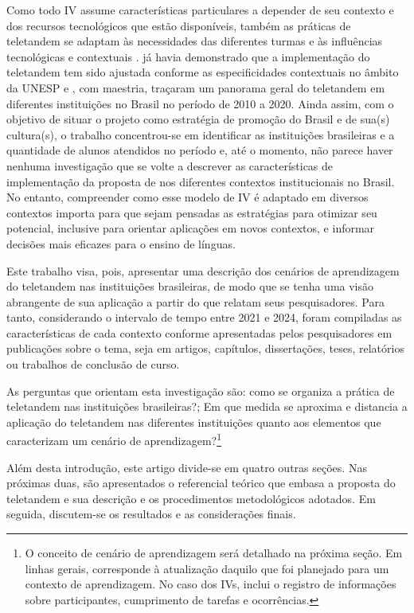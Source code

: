 \documentclass[portuguese]{textolivre}
\begin{document}
Como todo IV assume características particulares a depender de seu contexto e dos recursos tecnológicos que estão disponíveis, também as práticas de teletandem se adaptam às necessidades das diferentes turmas e às influências tecnológicas e contextuais \cite{aranha2021, cavalari2022, ferro2024, sartori2021}. \textcite{cavalari2018} já havia demonstrado que a implementação do teletandem tem sido ajustada conforme as especificidades contextuais no âmbito da UNESP e \textcite{aranha2021}, com maestria, traçaram um panorama geral do teletandem em diferentes instituições no Brasil no período de 2010 a 2020. Ainda assim, com o objetivo de situar o projeto como estratégia de promoção do Brasil e de sua(s) cultura(s), o trabalho concentrou-se em identificar as instituições brasileiras e a quantidade de alunos atendidos no período e, até o momento, não parece haver nenhuma investigação que se volte a descrever as características de implementação da proposta de \textcite{telles2006a} nos diferentes contextos institucionais no Brasil. No entanto, compreender como esse modelo de IV é adaptado em diversos contextos importa para que sejam pensadas as estratégias para otimizar seu potencial, inclusive para orientar aplicações em novos contextos, e informar decisões mais eficazes para o ensino de línguas.

Este trabalho visa, pois, apresentar uma descrição dos cenários de aprendizagem do teletandem nas instituições brasileiras, de modo que se tenha uma visão abrangente de sua aplicação a partir do que relatam seus pesquisadores. Para tanto, considerando o intervalo de tempo entre 2021 e 2024, foram compiladas as características de cada contexto conforme apresentadas pelos pesquisadores em publicações sobre o tema, seja em artigos, capítulos, dissertações, teses, relatórios ou trabalhos de conclusão de curso.

As perguntas que orientam esta investigação são: como se organiza a prática de teletandem nas instituições brasileiras?; Em que medida se aproxima e distancia a aplicação do teletandem nas diferentes instituições quanto aos elementos que caracterizam um cenário de aprendizagem?\footnote{O conceito de cenário de aprendizagem será detalhado na próxima seção. Em linhas gerais, corresponde à atualização daquilo que foi planejado para um contexto de aprendizagem. No caso dos IVs, inclui o registro de informações sobre participantes, cumprimento de tarefas e ocorrências.}

Além desta introdução, este artigo divide-se em quatro outras seções. Nas próximas duas, são apresentados o referencial teórico que embasa a proposta do teletandem e sua descrição e os procedimentos metodológicos adotados. Em seguida, discutem-se os resultados e as considerações finais.
\end{document}
